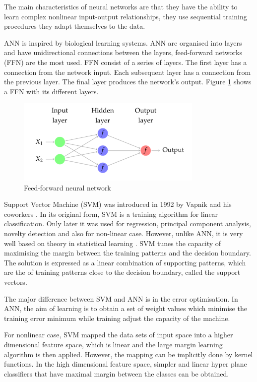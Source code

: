 The main characteristics of neural networks are that they have the ability to learn
complex nonlinear input-output relationships, they use sequential training procedures 
they adapt themselves to the data.

ANN is inspired by biological learning systems. ANN are organised into layers and have unidirectional connections between the layers, feed-forward networks  (FFN) are the most used.  FFN consist of a series of layers. The first layer has a connection from the network input. Each subsequent layer has a connection from the previous layer. The final layer produces the network's output. Figure \ref{fig:ffn} shows a FFN with its different layers.

\begin{figure}[!h]
  \centering
  \includegraphics[width=0.8\textwidth]{img/ffn}
  \caption{Feed-forward neural network}
  \label{fig:ffn}
\end{figure}


Support Vector Machine (SVM) was introduced in 1992 by Vapnik and his coworkers
\cite{boser1992}. In its original form, SVM is a training algorithm for linear classification. Only later it was used for regression, principal component analysis, novelty detection and also for non-linear case.  However, unlike ANN, it is very well 
based on theory in statistical learning \cite{cortes1995}.  SVM tunes the capacity of 
maximising the margin between the training patterns and the decision boundary. The
solution is expressed as a linear combination of supporting patterns, which are the 
of training patterns close to the decision boundary, called the support vectors.

The major difference between SVM and ANN is in the error optimisation. In ANN, the aim of learning is to obtain a set of weight values which minimise the training error 
minimum while training adjust the capacity of the machine. 

For nonlinear case, SVM mapped the data sets of input space into a higher dimensional feature space, which is linear and the large margin learning algorithm is then applied. However, the mapping can be implicitly done by kernel functions. In the high dimensional feature space, simpler and linear hyper plane classifiers that have maximal margin between the classes can be obtained.

